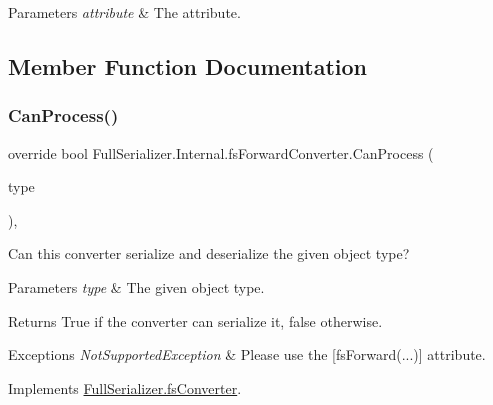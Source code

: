 \begin{DoxyParams}{Parameters}
{\em attribute} & The attribute.\\
\hline
\end{DoxyParams}


\subsection{Member Function Documentation}
\mbox{\label{class_full_serializer_1_1_internal_1_1fs_forward_converter_a252f2f0a0391e2099be798b1749a2582}} 
\subsubsection{\texorpdfstring{Can\+Process()}{CanProcess()}}
{\footnotesize\ttfamily override bool Full\+Serializer.\+Internal.\+fs\+Forward\+Converter.\+Can\+Process (\begin{DoxyParamCaption}\item[{Type}]{type }\end{DoxyParamCaption})\hspace{0.3cm}{\ttfamily [inline]}, {\ttfamily [virtual]}}



Can this converter serialize and deserialize the given object type? 


\begin{DoxyParams}{Parameters}
{\em type} & The given object type.\\
\hline
\end{DoxyParams}
\begin{DoxyReturn}{Returns}
True if the converter can serialize it, false otherwise.
\end{DoxyReturn}

\begin{DoxyExceptions}{Exceptions}
{\em Not\+Supported\+Exception} & Please use the \mbox{[}fs\+Forward(...)\mbox{]} attribute.\\
\hline
\end{DoxyExceptions}


Implements \hyperlink{class_full_serializer_1_1fs_converter_a6d9e084c5e7f646a8d220705efaecb35}{Full\+Serializer.\+fs\+Converter}.

